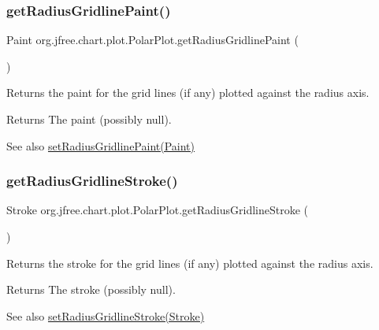 \subsubsection{\texorpdfstring{get\+Radius\+Gridline\+Paint()}{getRadiusGridlinePaint()}}
{\footnotesize\ttfamily Paint org.\+jfree.\+chart.\+plot.\+Polar\+Plot.\+get\+Radius\+Gridline\+Paint (\begin{DoxyParamCaption}{ }\end{DoxyParamCaption})}

Returns the paint for the grid lines (if any) plotted against the radius axis.

\begin{DoxyReturn}{Returns}
The paint (possibly {\ttfamily null}).
\end{DoxyReturn}
\begin{DoxySeeAlso}{See also}
\mbox{\hyperlink{classorg_1_1jfree_1_1chart_1_1plot_1_1_polar_plot_a975386d543478708d2273a841aa96455}{set\+Radius\+Gridline\+Paint(\+Paint)}} 
\end{DoxySeeAlso}
\mbox{\label{classorg_1_1jfree_1_1chart_1_1plot_1_1_polar_plot_a1b4ef859b3d90ec47c795f53c66eddb0}} 
\subsubsection{\texorpdfstring{get\+Radius\+Gridline\+Stroke()}{getRadiusGridlineStroke()}}
{\footnotesize\ttfamily Stroke org.\+jfree.\+chart.\+plot.\+Polar\+Plot.\+get\+Radius\+Gridline\+Stroke (\begin{DoxyParamCaption}{ }\end{DoxyParamCaption})}

Returns the stroke for the grid lines (if any) plotted against the radius axis.

\begin{DoxyReturn}{Returns}
The stroke (possibly {\ttfamily null}).
\end{DoxyReturn}
\begin{DoxySeeAlso}{See also}
\mbox{\hyperlink{classorg_1_1jfree_1_1chart_1_1plot_1_1_polar_plot_a925128302a5680329e7629b689568d6c}{set\+Radius\+Gridline\+Stroke(\+Stroke)}} 
\end{DoxySeeAlso}
\mbox{\label{classorg_1_1jfree_1_1chart_1_1plot_1_1_polar_plot_a49334753a560393d54d2d988577bd23c}} 
